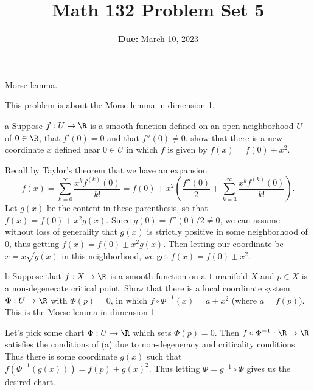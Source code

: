\documentclass[11pt,letterpaper]{article}
\title{\textbf{Math 132 Problem Set 5}}
\date{\textbf{Due:} March 10, 2023}
\begin{document}
\maketitle

\begin{problem}
    Morse lemma.
\end{problem}

\begin{solution}
    \quad This problem is about the Morse lemma in dimension 1.
    \begin{partproblem}{a}
        Suppose $f : U \to \R$ is a smooth function defined on an open neighborhood $U$ of $0\in \R$, that $f'(0)=0$ and that $f''(0)\neq 0$. show that there is a new coordinate $x$ defined near $0\in U$ in which $f$ is given by $f(x)=f(0)\pm x^2$.
    \end{partproblem}
    
    \quad Recall by Taylor's theorem that we have an expansion
    \[
        f(x) = \sum_{k=0}^\infty \frac{x^k f^{(k)}(0)}{k!} = f(0) + x^2\left(\frac{f''(0)}{2} + \sum^{\infty}_{k=3} \frac{x^k f^{(k)}(0)}{k!}\right)
    .\] 
    Let $g(x)$ be the content in these parenthesis, so that $f(x)=f(0)+x^2g(x)$. Since $g(0)=f''(0) / 2\neq 0$, we can assume without loss of generality that $g(x)$ is strictly positive in some neighborhood of $0$, thus getting $f(x)=f(0)\pm x^2g(x)$. Then letting our coordinate be $x=x\sqrt{g(x)}$ in this neighborhood, we get $f(x)=f(0)\pm x^2$. 

    \begin{partproblem}{b}
        Suppose that $f : X \to \R$ is a smooth function on a $1$-manifold $X$ and $p\in X$ is a non-degenerate critical point. Show that there is a local coordinate system $\Phi : U \to \R$ with $\Phi(p)=0$, in which $f\circ \Phi^{-1}(x)=a\pm x^2$ (where $a=f(p)$). This is the Morse lemma in dimension 1.
    \end{partproblem}
    \quad Let's pick some chart $\Phi : U \to \R$ which sets $\Phi(p)=0$. Then $f\circ \Phi^{-1} : \R \to \R$ satisfies the conditions of (a) due to non-degeneracy and criticality conditions. Thus there is some coordinate $g(x)$ such that $f(\Phi^{-1}(g(x))) = f(p)\pm g(x)^2$. Thus letting $\Phi = g^{-1}\circ \Phi$ gives us the desired chart.
\end{solution}
\end{document}
